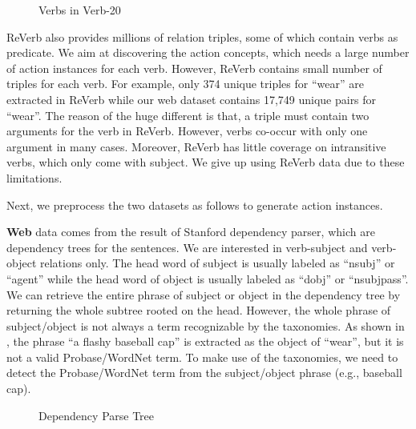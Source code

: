 \begin{figure}[th]
\centering
{}
\caption{Verbs in Verb-20}
\label{fig:verb20}
\end{figure}

ReVerb also provides millions of relation triples, some of which contain
verbs as predicate.
We aim at discovering the action concepts,
which needs a large number of action instances
for each verb. However, ReVerb contains small number of triples for each verb.
For example, only 374 unique triples for ``wear'' are
extracted in ReVerb while our web dataset contains 17,749 unique
 pairs for ``wear''.
The reason of the huge different is that,
a triple must contain two arguments for the verb in ReVerb. However,
verbs co-occur with only one argument in many cases.
Moreover, ReVerb has little coverage on
intransitive verbs, which only come with subject.
We give up using ReVerb data due to these limitations.

Next, we preprocess the two datasets as follows to
generate action instances.

{\bf Web} data comes from the result of Stanford dependency parser,
which are dependency trees for the sentences. We are interested in
verb-subject and verb-object relations only.
The head word of subject is usually labeled
as ``nsubj'' or ``agent'' while the head word of object is usually
labeled as ``dobj'' or ``nsubjpass''.
We can retrieve the entire phrase of subject or object in the dependency
tree by returning the whole subtree rooted on the head.
However, the whole phrase of subject/object is not always
a term recognizable by the taxonomies. As shown in ,
the phrase ``a flashy baseball cap''
is extracted as the object of ``wear'', but 
it is not a valid Probase/WordNet term.
To make use of the taxonomies, we need to
detect the Probase/WordNet term from the subject/object phrase
(e.g., baseball cap).

\begin{figure}[th]
\centering
{}
\caption{Dependency Parse Tree}
\label{fig:pterm}
\end{figure}

